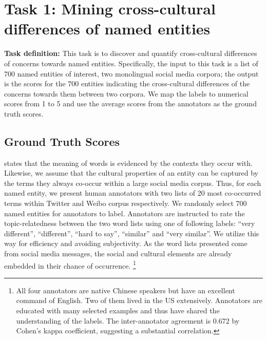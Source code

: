 \section{Task 1: Mining cross-cultural differences of named entities}
\label{sec:mcdne}

\textbf{Task definition:}
	This task is to discover and quantify cross-cultural differences of concerns towards named entities.  
	Specifically, the input to this task is a list of 700 named entities of interest, two monolingual social media corpora; the output is the scores for the 700 entities indicating the cross-cultural differences of the concerns towards them between two corpora. 
	We map the labels to numerical scores from 1 to 5 and use the average scores from the annotators as the ground truth {scores}. 

\subsection{Ground Truth Scores}
\label{sec:mcdne_truth}
\cite{harris1954distributional} states that the meaning of 
words is evidenced by the contexts they occur with. 
Likewise, we assume that the cultural properties of an entity 
can be captured by the terms they always co-occur within a large social media corpus. 
Thus, for each named entity, we present human annotators with two lists of 20 most co-occurred terms within Twitter and Weibo corpus respectively. 
We randomly select 700 named entities for annotators to label.
Annotators are instructed to rate the topic-relatedness between the 
two word lists using one of following labels: ``very different'', 
``different'', ``hard to say'',  ``similar'' and 
``very similar''. We utilize this way for efficiency and avoiding subjectivity. 
As the word lists presented come from social media messages, the social and cultural elements are already embedded in their chance of occurrence.
\footnote{All four annotators are native Chinese speakers 
but have an excellent command of English. Two of them lived in the US extensively. 
Annotators are educated with many 
selected examples and thus have shared the understanding of the
labels. The inter-annotator agreement is 0.672 by Cohen's kappa coefficient, 
suggesting a substantial correlation.} 



